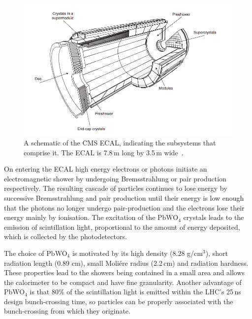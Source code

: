\begin{figure}
  \includegraphics[width=1.2\largefigwidth]{plots/detector/ecal_layout.png}
  \caption[A schematic of the CMS ECAL, indicating the subsystems that comprise it. The ECAL is 7.8\,m long by 3.5\,m wide.]{A schematic of the CMS ECAL, indicating the subsystems that comprise it. The ECAL is 7.8\,m long by 3.5\,m wide~\cite{Chatrchyan:2008aa}.}
  \label{fig:ecalschematic}
\end{figure}

 On entering the \ac{ECAL} high energy electrons or photons initiate an electromagnetic shower by undergoing Bremsstrahlung or pair production respectively. The resulting cascade of particles continues to lose energy by successive Bremsstrahlung and pair production until their energy is low enough that the photons no longer undergo pair-production and the electrons lose their energy mainly by ionisation. The excitation of the PbWO$_{4}$ crystals leads to the emission of scintillation light, proportional to the amount of energy deposited, which is collected by the photodetectors.

The choice of PbWO$_{4}$ is motivated by its high density (8.28 g/cm$^{3}$), short radiation length (0.89 cm), small Moli\'{e}re radius (2.2\,cm) and radiation hardness. These properties lead to the showers being contained in a small area and allows the calorimeter to be compact and have fine granularity. Another advantage of PbWO$_{4}$ is that 80\% of the scintillation light is emitted within the LHC's 25\,ns design bunch-crossing time, so particles can be properly associated with the bunch-crossing from which they originate.

